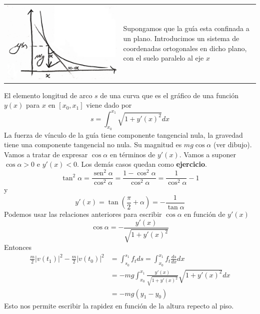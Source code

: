 \documentclass{article}
\DeclareMathOperator{\sen}{sen}
\begin{document}
\begin{tabular}{m{5cm} m{4.5cm}}
 \includegraphics[scale=.07]{imagenes/caida_guia.jpg} & Supongamos que la guía esta
confinada a un plano. Introducimos un sistema de coordenadas ortogonales en dicho plano, con el suelo paralelo al eje $x$
\end{tabular}

El elemento longitud de arco $s$ de una curva que es el gráfico de una función $y(x)$ para $x$ en $[x_0,x_1]$ viene dado por 
\[s=\int_{x_0}^{x_1}\sqrt{1+y'(x)^2}dx\]
La fuerza de vínculo de la guía tiene componente tangencial nula,  la gravedad tiene una componente tangencial no nula. 
Su magnitud es $mg\cos\alpha$ (ver dibujo). Vamos a tratar de expresar $\cos\alpha$  en términos de   $y'(x)$. Vamos a suponer $\cos\alpha>0$ e $y'(x)<0$. 
Los demás casos quedan como \textbf{ejercicio}.
\[ \tan^2\alpha=\frac{\sen^2\alpha}{\cos^2\alpha}=\frac{1-\cos^2\alpha}{\cos^2\alpha}=\frac{1}{\cos^2\alpha}-1\]
y
\[y'(x)=\tan \left(\frac{\pi}{2}+\alpha\right)=-\frac{1}{\tan\alpha}\]
Podemos usar las relaciones anteriores para escribir $\cos\alpha$ en función de $y'(x)$
\begin{equation}\label{cos_alpha}\cos\alpha=-\frac{y'(x)}{\sqrt{1+y'(x)^2}}\end{equation}
Entonces
\begin{equation}\label{cons_ener}
 \begin{split} \frac{m}{2}|v(t_1)|^2-\frac{m}{2}|v(t_0)|^2&=\int_{s_0}^{s_1}f_tds =\int_{x_0}^{x_1}f_t\frac{ds}{dx}dx\\
&= -mg\int_{x_0}^{x_1}\frac{y'(x)}{\sqrt{1+y'(x)^2}}\sqrt{1+y'(x)^2}dx\\
&=-mg\left(y_1-y_0\right)
    \end{split}\end{equation}
Esto nos permite escribir la rapidez en función de la altura repecto al piso.
\end{document}
